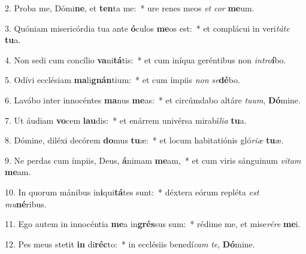 2. Proba me, Dómi\textbf{ne}, et \textbf{ten}ta me:~*  ure renes meos \textit{et} \textit{cor} \textbf{me}um.\

3. Quóniam misericórdia tua ante \textbf{ó}culos \textbf{me}os est:~*  et complácui in veri\textit{tá}\textit{te} \textbf{tu}a.\

4. Non sedi cum concílio \textbf{va}ni\textbf{tá}tis:~*  et cum iníqua geréntibus non \textit{in}\textit{tro}\textbf{í}bo.\

5. Odívi ecclésiam \textbf{ma}li\textbf{gnán}tium:~*  et cum ímpiis \textit{non} \textit{se}\textbf{dé}bo.\

6. Lavábo inter innocéntes \textbf{ma}nus \textbf{me}as:~*  et circúmdabo altáre \textit{tu}\textit{um}, \textbf{Dó}mine.\

7. Ut áudiam \textbf{vo}cem \textbf{lau}dis:~*  et enárrem univérsa mirabí\textit{li}\textit{a} \textbf{tu}a.\

8. Dómine, diléxi decórem \textbf{do}mus \textbf{tu}æ:~*  et locum habitatiónis gló\textit{ri}\textit{æ} \textbf{tu}æ.\

9. Ne perdas cum ímpiis, Deus, \textbf{á}nimam \textbf{me}am,~*  et cum viris sánguinum \textit{vi}\textit{tam} \textbf{me}am.\

10. In quorum mánibus in\textbf{i}qui\textbf{tá}tes sunt:~*  déxtera eórum repléta \textit{est} \textit{mu}\textbf{né}ribus.\

11. Ego autem in innocéntia \textbf{me}a in\textbf{grés}sus sum:~*  rédime me, et mise\textit{ré}\textit{re} \textbf{me}i.\

12. Pes meus stetit \textbf{in} di\textbf{réc}to:~*  in ecclésiis benedí\textit{cam} \textit{te}, \textbf{Dó}mine.\

